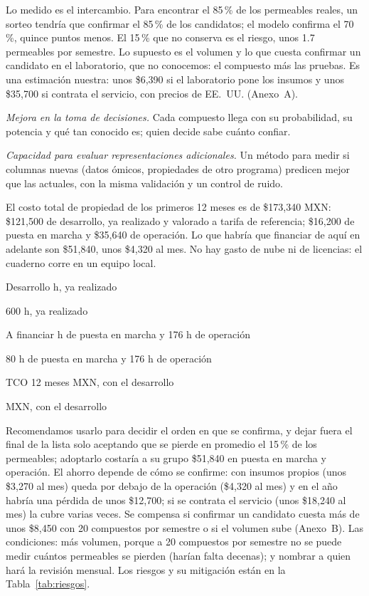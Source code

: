 \documentclass[letterpaper,11pt]{article}
\newlength{\alturacifra}\setlength{\alturacifra}{2.3cm}
\newcommand{\cifra}[5]{%
  \begingroup\setlength{\fboxsep}{5pt}%
  \colorbox{#1}{\parbox[t][\alturacifra][t]{\dimexpr\linewidth-2\fboxsep\relax}{%
    \setstretch{1}\raggedright\color{#2}{\Large\bfseries #3}\par
    #4%
    \ifx\relax#5\relax\else\par{\footnotesize #5}\fi}}%
  \endgroup}
\newcommand{\cifragris}[4]{\cifra{black!8}{black}{#1}{#2}{#3}}
\begin{document}
\medskip

Lo medido es el intercambio. Para encontrar el 85\,\% de los permeables reales, un sorteo tendría que confirmar el 85\,\% de los candidatos; el modelo confirma el 70\,\%, quince puntos menos. El 15\,\% que no conserva es el riesgo, unos 1.7 permeables por semestre. Lo supuesto es el volumen y lo que cuesta confirmar un candidato en el laboratorio, que no conocemos: el compuesto más las pruebas. Es una estimación nuestra: unos \$6,390 si el laboratorio pone los insumos y unos \$35,700 si contrata el servicio, con precios de EE.~UU. (Anexo~A).

\smallskip
\noindent\textit{Mejora en la toma de decisiones.} Cada compuesto llega con su probabilidad, su potencia y qué tan conocido es; quien decide sabe cuánto confiar.\par
\smallskip
\noindent\textit{Capacidad para evaluar representaciones adicionales.} Un método para medir si columnas nuevas (datos ómicos, propiedades de otro programa) predicen mejor que las actuales, con la misma validación y un control de ruido.\par
\smallskip

El costo total de propiedad de los primeros 12 meses es de \$173,340 MXN: \$121,500 de desarrollo, ya realizado y valorado a tarifa de referencia; \$16,200 de puesta en marcha y \$35,640 de operación. Lo que habría que financiar de aquí en adelante son \$51,840, unos \$4,320 al mes. No hay gasto de nube ni de licencias: el cuaderno corre en un equipo local.

\medskip
\noindent
\setlength{\alturacifra}{1.9cm}
\begin{minipage}[t]{0.31\linewidth}\cifragris{\$121,500}{Desarrollo}{600 h, ya realizado}{}\end{minipage}\hfill
\begin{minipage}[t]{0.31\linewidth}\cifragris{\$51,840}{A financiar}{80 h de puesta en marcha y 176 h de operación}{}\end{minipage}\hfill
\begin{minipage}[t]{0.31\linewidth}\cifragris{\$173,340}{TCO 12 meses}{MXN, con el desarrollo}{}\end{minipage}
\smallskip

Recomendamos usarlo para decidir el orden en que se confirma, y dejar fuera el final de la lista solo aceptando que se pierde en promedio el 15\,\% de los permeables; adoptarlo costaría a su grupo \$51,840 en puesta en marcha y operación. El ahorro depende de cómo se confirme: con insumos propios (unos \$3,270 al mes) queda por debajo de la operación (\$4,320 al mes) y en el año habría una pérdida de unos \$12,700; si se contrata el servicio (unos \$18,240 al mes) la cubre varias veces. Se compensa si confirmar un candidato cuesta más de unos \$8,450 con 20 compuestos por semestre o si el volumen sube (Anexo~B). Las condiciones: más volumen, porque a 20 compuestos por semestre no se puede medir cuántos permeables se pierden (harían falta decenas); y nombrar a quien hará la revisión mensual. Los riesgos y su mitigación están en la Tabla~\ref{tab:riesgos}.
\end{document}
